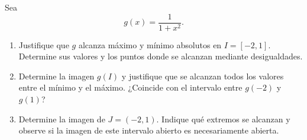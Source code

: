 \documentclass[10pt,a4paper]{article}
\newif\ifmostrarSoluciones
\newenvironment{solucionejercicio}[1]{%
  \par\medskip\noindent\textbf{Solución del ejercicio #1.}%
  \enspace\ignorespaces
}{%
  \par\medskip
}
\begin{document}
\ifmostrarSoluciones
\begin{solucionejercicio}{1}
  \begin{enumerate}
    \item En $1$, el límite bilateral es $2$, pero $f(1)=-1$. Es una discontinuidad removible; se repara asignando $f(1)=2$. En $2$, los límites laterales difieren: hay una discontinuidad de salto y ningún cambio aislado de $f(2)$ la elimina. En $3$, el límite bilateral es $0$, pero no hay valor asignado. Se obtiene una extensión continua definiendo $f(3)=0$.
    \item La aplicación es incorrecta porque $f$ no es continua en $1$. Como $\lim_{x\to1}f(x)=2>0$, los valores suficientemente cercanos con $x\neq1$ son positivos, aunque el valor aislado $f(1)$ sea negativo. Se debe distinguir la preservación del signo a partir de un límite positivo de la aplicación del teorema de continuidad usando $f(1)$.
    \item En el primer boceto, ambas ramas se acercan al punto abierto $(1,2)$ y se marca el punto lleno $(1,-1)$. Basta trasladar ese valor aislado a la altura $2$. En el segundo, la rama izquierda se acerca a $(2,-1)$, la derecha a $(2,1)$ y se marca $(2,0)$ como punto lleno. Cambiar este último no modifica las dos alturas laterales distintas.
  \end{enumerate}
\end{solucionejercicio}
\fi

\begin{ejerciciopractica}
  Sea
  \[
    g(x)=\frac1{1+x^2}.
  \]
  \begin{enumerate}
    \item Justifique que $g$ alcanza máximo y mínimo absolutos en $I=[-2,1]$. Determine sus valores y los puntos donde se alcanzan mediante desigualdades.
    \item Determine la imagen $g(I)$ y justifique que se alcanzan todos los valores entre el mínimo y el máximo. ¿Coincide con el intervalo entre $g(-2)$ y $g(1)$?
    \item Determine la imagen de $J=(-2,1)$. Indique qué extremos se alcanzan y observe si la imagen de este intervalo abierto es necesariamente abierta.
  \end{enumerate}
\end{ejerciciopractica}
\end{document}

